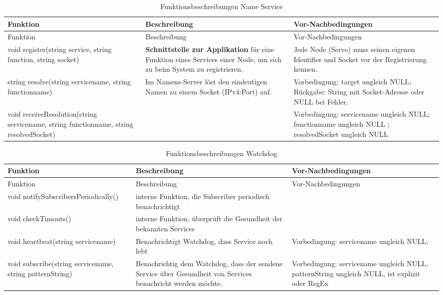 \begin{longtable}{|>{\raggedright\arraybackslash}p{4cm}|>{\raggedright\arraybackslash}p{5cm}|>{\raggedright\arraybackslash}p{5cm}|}
	\caption{Funktionsbeschreibungen Name Service} \label{tab:loesungsstrategie} \\
	\hline
	Funktion & Beschreibung & Vor-Nachbedingungen \\
	\hline
	\endfirsthead
	
	\hline
	Funktion & Beschreibung & Vor-Nachbedingungen \\
	\hline
	\endhead
	
	\hline
	\endfoot
	
	void register(string service, string function, string socket) & 
	\textbf{Schnittstelle zur Applikation} für eine Funktion eines Services einer Node, um sich zu beim System zu registrieren. 
	& Jede Node (Servo) muss seinen eigenen Identifier und Socket vor der Registrierung kennen. 
	\\
	\hline
	string resolve(string servicename, string functionname)
	& Im Namens-Server löst den eindeutigen Namen zu einem Socket (IPv4:Port) auf.
	& Vorbedingung: target ungleich NULL; Rückgabe: String mit Socket-Adresse oder NULL bei Fehler.
	\\
	\hline
	void receiveResolution(string servicename, string functionname, string resolvedSocket)
	& 
	& Vorbedingung: servicename ungleich NULL; functionname ungleich NULL ; resolvedSocket ungleich NULL
	\\
	\hline
\end{longtable}


\begin{longtable}{|>{\raggedright\arraybackslash}p{4cm}|>{\raggedright\arraybackslash}p{5cm}|>{\raggedright\arraybackslash}p{5cm}|}
	\caption{Funktionsbeschreibungen Watchdog} \label{tab:loesungsstrategie} \\
	\hline
	Funktion & Beschreibung & Vor-Nachbedingungen \\
	\hline
	\endfirsthead
	
	\hline
	Funktion & Beschreibung & Vor-Nachbedingungen \\
	\hline
	\endhead
	
	\hline
	\endfoot
	
	
	void notifySubscribersPeriodically() 
	& interne Funktion, die Subscriber periodisch benachrichtigt
	&  
	\\
	\hline
	void checkTimouts() & 
	interne Funktion, überprüft die Gesundheit der bekannten Services
	&  
	\\
	\hline
	void heartbeat(string servicename)
	& Benachrichtigt Watchdog, dass Service noch lebt
	& Vorbedingung: servicename ungleich NULL; 
	\\
	\hline
	void subscribe(string servicename, string patternString)
	& Benachrichtig dem Watchdog, dass der sendene Service über Gesundheit von Services benachricht werden möchte. 
	& Vorbedingung: servicename ungleich NULL, patternString ungleich NULL, ist explizit oder RegEx
	\\
	\hline
	
	
	
\end{longtable}

